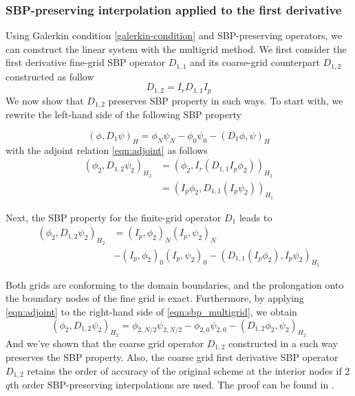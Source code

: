 \subsubsection{SBP-preserving interpolation applied to the first derivative}
Using Galerkin condition \autoref{galerkin-condition} and SBP-preserving operators, we can construct the linear system with the multigrid method. We first consider the first derivative fine-grid SBP operator $D_{1,1}$ and its coarse-grid counterpart $D_{1,2}$ constructed as follow
\begin{equation}
    D_{1,2} = I_r D_{1,1} I_p
\end{equation}
We now show that $D_{1,2}$ preserves SBP property in such ways. To start with, we rewrite the left-hand side of the following SBP property

\begin{equation}
    (\phi,D_1\psi)_H = \phi_N\psi_N - \phi_0\psi_0 - (D_1\phi,\psi)_H
\end{equation}
with the adjoint relation \autoref{eqn:adjoint} as follows
\begin{align}
    (\phi_2,D_{1,2}\psi_2)_{H_2} &= (\phi_2,I_r(D_{1,1}I_p\phi_2))_{H_2} \nonumber\\&= (I_p\phi_2,D_{1,1}(I_p\psi_2))_{H_1}
\end{align}

Next, the SBP property for the finite-grid operator $D_1$ leads to
\begin{align}
     (\phi_2,D_{1,2}\psi_2)_{H_2} &= (I_p,\phi_2)_N(I_p,\psi_2)_N \nonumber \\ &- (I_p,\phi_2)_0(I_p,\psi_2)_0 - (D_{1,1}(I_p\phi_2),I_p\psi_2)_{H_1}
     \label{eqn:sbp_multigrid}
\end{align}

Both grids are conforming to the domain boundaries, and the prolongation onto the boundary nodes of the fine grid is exact. Furthermore, by applying \autoref{eqn:adjoint} to the right-hand side of \autoref{eqn:sbp_multigrid}, we obtain 
\begin{equation}
    (\phi_2,D_{1,2}\psi_2)_{H_2} = \phi_{2,N/2}\psi_{2,N/2} - \phi_{2,0}\psi_{2,0} - (D_{1,2}\phi_{2},\psi_{2})_{H_2}
\end{equation}
And we've shown that the coarse grid operator $D_{1,2}$ constructed in a such way preserves the SBP property. Also, the coarse grid first derivative SBP operator $D_{1,2}$ retains the order of accuracy of the original scheme at the interior nodes if 2$q$th order SBP-preserving interpolations are used. The proof can be found in \citep{ruggiu2018new}.


